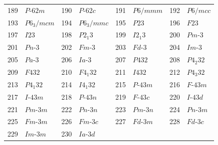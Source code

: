 \documentclass[12pt]{article}
\begin{document}
\begin{center}
{\begin{tabular}{|r|l||r|l||r|l||r|l|}
 189 & $P\mbox{-}62m$                         & 190 & $P\mbox{-}62c$                         & 191 & $P6/mmm$                               & 192 & $P6/mcc$                               \\
 193 & $P6_{3}/mcm$                           & 194 & $P6_{3}/mmc$                           & 195 & $P23$                                  & 196 & $F23$                                  \\
 197 & $I23$                                  & 198 & $P2_{1}3$                              & 199 & $I2_{1}3$                              & 200 & $Pm\mbox{-}3$                          \\
 201 & $Pn\mbox{-}3$                          & 202 & $Fm\mbox{-}3$                          & 203 & $Fd\mbox{-}3$                          & 204 & $Im\mbox{-}3$                          \\
 205 & $Pa\mbox{-}3$                          & 206 & $Ia\mbox{-}3$                          & 207 & $P432$                                 & 208 & $P4_{2}32$                             \\
 209 & $F432$                                 & 210 & $F4_{1}32$                             & 211 & $I432$                                 & 212 & $P4_{3}32$                             \\
 213 & $P4_{1}32$                             & 214 & $I4_{1}32$                             & 215 & $P\mbox{-}43m$                         & 216 & $F\mbox{-}43m$                         \\
 217 & $I\mbox{-}43m$                         & 218 & $P\mbox{-}43n$                         & 219 & $F\mbox{-}43c$                         & 220 & $I\mbox{-}43d$                         \\
 221 & $Pm\mbox{-}3m$                         & 222 & $Pn\mbox{-}3n$                         & 223 & $Pm\mbox{-}3n$                         & 224 & $Pn\mbox{-}3m$                         \\
 225 & $Fm\mbox{-}3m$                         & 226 & $Fm\mbox{-}3c$                         & 227 & $Fd\mbox{-}3m$                         & 228 & $Fd\mbox{-}3c$                         \\
 229 & $Im\mbox{-}3m$                         & 230 & $Ia\mbox{-}3d$                         &     &                                        &     &                                        \\
\hline
\end{tabular}
}
\end{center}
\end{document}
